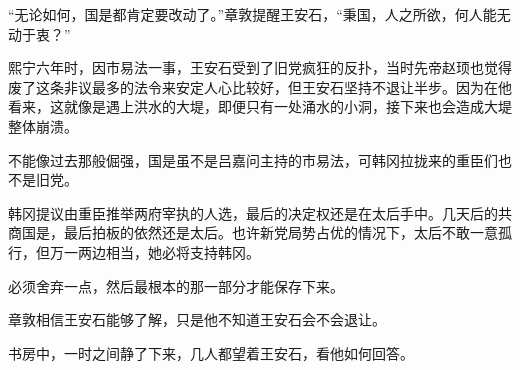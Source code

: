“无论如何，国是都肯定要改动了。”章敦提醒王安石，“秉国，人之所欲，何人能无动于衷？”

熙宁六年时，因市易法一事，王安石受到了旧党疯狂的反扑，当时先帝赵顼也觉得废了这条非议最多的法令来安定人心比较好，但王安石坚持不退让半步。因为在他看来，这就像是遇上洪水的大堤，即便只有一处涌水的小洞，接下来也会造成大堤整体崩溃。

不能像过去那般倔强，国是虽不是吕嘉问主持的市易法，可韩冈拉拢来的重臣们也不是旧党。

韩冈提议由重臣推举两府宰执的人选，最后的决定权还是在太后手中。几天后的共商国是，最后拍板的依然还是太后。也许新党局势占优的情况下，太后不敢一意孤行，但万一两边相当，她必将支持韩冈。

必须舍弃一点，然后最根本的那一部分才能保存下来。

章敦相信王安石能够了解，只是他不知道王安石会不会退让。

书房中，一时之间静了下来，几人都望着王安石，看他如何回答。
